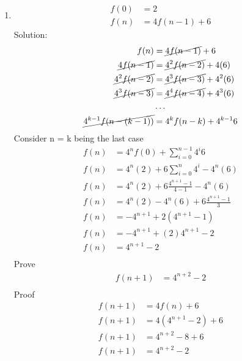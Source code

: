 \documentclass{article}
\begin{document}
\begin{enumerate}
\item
  \begin{align*}
    f(0) &= 2\\
    f(n) &= 4f(n-1) + 6
  \end{align*}
  Solution:
  \begin{align*}
    f(n) &= \cancel{4f(n-1)}+6\\ 
    \cancel{4f(n-1)} &= \cancel{4^2f(n-2)} +4(6)\\ 
    \cancel{4^2f(n-2)} &= \cancel{4^3f(n-3)} +4^2(6)\\ 
    \cancel{4^3f(n-3)} &= \cancel{4^4f(n-4)} +4^3(6)\\ 
    &\ldots\\
    \cancel{4^{k-1}f(n-(k-1))} &= 4^kf(n-k)+4^{k-1}6
  \end{align*}
  Consider n = k being the last case
  \begin{align*}
    f(n) &= 4^nf(0)+ \sum_{i=0}^{n-1}4^i6 \\
    f(n) &= 4^n(2)+ 6\sum_{i=0}^{n}4^i - 4^n(6) \\
    f(n) &= 4^n(2)+ 6\frac{4^{n+1} - 1}{4-1} - 4^n(6) \\
    f(n) &= 4^n(2) - 4^n(6) + 6\frac{4^{n+1} - 1}{3}  \\
    f(n) &= -4^{n + 1} + 2(4^{n+1} - 1)  \\
    f(n) &= -4^{n + 1} + (2)4^{n+1} - 2  \\
    f(n) &= 4^{n+1} - 2  \\
  \end{align*}
  Prove
  \begin{align*}
    f(n+1) &= 4^{n+2} - 2 \\
  \end{align*}
  Proof
  \begin{align*}
    f(n+1) &= 4f(n) + 6 \\
    f(n+1) &= 4(4^{n+1} - 2) + 6 \\
    f(n+1) &= 4^{n+2} - 8 + 6\\
    f(n+1) &= 4^{n+2} - 2\\
  \end{align*}



\end{enumerate}
\end{document}
